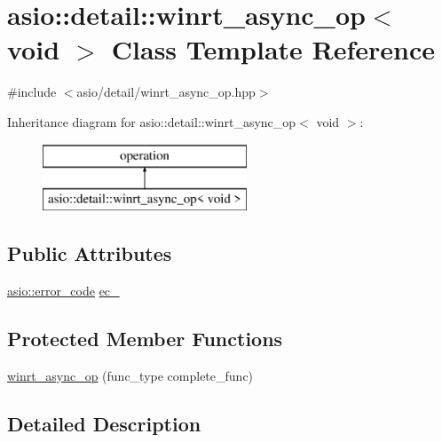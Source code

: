 \hypertarget{classasio_1_1detail_1_1winrt__async__op_3_01void_01_4}{}\section{asio\+:\+:detail\+:\+:winrt\+\_\+async\+\_\+op$<$ void $>$ Class Template Reference}
\label{classasio_1_1detail_1_1winrt__async__op_3_01void_01_4}


{\ttfamily \#include $<$asio/detail/winrt\+\_\+async\+\_\+op.\+hpp$>$}

Inheritance diagram for asio\+:\+:detail\+:\+:winrt\+\_\+async\+\_\+op$<$ void $>$\+:\begin{figure}[H]
\begin{center}
\leavevmode
\includegraphics[height=2.000000cm]{classasio_1_1detail_1_1winrt__async__op_3_01void_01_4}
\end{center}
\end{figure}
\subsection*{Public Attributes}
\begin{DoxyCompactItemize}
\item 
\hyperlink{classasio_1_1error__code}{asio\+::error\+\_\+code} \hyperlink{classasio_1_1detail_1_1winrt__async__op_3_01void_01_4_aad658595d15bf780e9c971f3f0db31a3}{ec\+\_\+}
\end{DoxyCompactItemize}
\subsection*{Protected Member Functions}
\begin{DoxyCompactItemize}
\item 
\hyperlink{classasio_1_1detail_1_1winrt__async__op_3_01void_01_4_a2f5ec7d4b733adcd43a06574e4143110}{winrt\+\_\+async\+\_\+op} (func\+\_\+type complete\+\_\+func)
\end{DoxyCompactItemize}


\subsection{Detailed Description}
